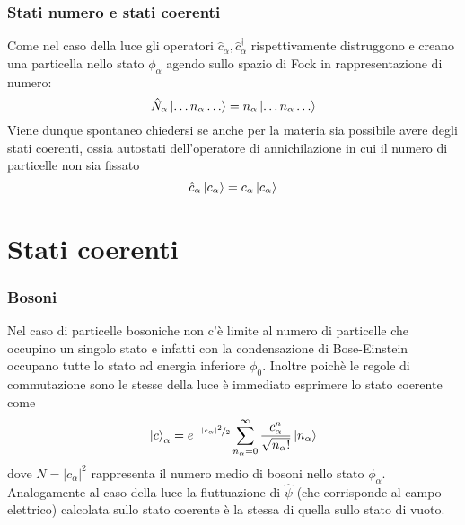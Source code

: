 \documentclass{beamer}
\begin{document}
\begin{frame}
  \frametitle{Stati numero e stati coerenti}
  Come nel caso della luce gli operatori $\hat{c}_{\alpha},\hat{c}_{\alpha}^\dagger$ rispettivamente distruggono e creano una particella nello stato $\phi_\alpha$ agendo sullo spazio di Fock in rappresentazione di numero:
  \begin{equation*}
    \hat{N}_\alpha \ket{\dots n_\alpha \dots} = n_\alpha \ket{\dots n_\alpha \dots}
  \end{equation*}
  Viene dunque spontaneo chiedersi se anche per la materia sia possibile avere degli stati coerenti, ossia autostati dell'operatore di annichilazione in cui il numero di particelle non sia fissato
  \begin{equation*}
    \hat{c}_\alpha \ket{c_\alpha} = c_\alpha \ket{c_\alpha}
  \end{equation*}
\end{frame}

\section{Stati coerenti}
\begin{frame}
  \frametitle{Bosoni}
  Nel caso di particelle bosoniche non c'è limite al numero di particelle che occupino un singolo stato e infatti con la condensazione di Bose-Einstein occupano tutte lo stato ad energia inferiore $\phi_0$. Inoltre poichè le regole di commutazione sono le stesse della luce è immediato esprimere lo stato coerente come
  \begin{equation*}
    \ket{c}_\alpha = e^{-\frac[f]{|c_\alpha|^2}{2}} \sum_{n_\alpha = 0}^\infty \frac{c_\alpha^n}{\sqrt{n_\alpha!}} \ket{n_\alpha}
  \end{equation*}
  dove $\overbar{N} = |c_\alpha|^2$ rappresenta il numero medio di bosoni nello stato $\phi_\alpha$.\\
  Analogamente al caso della luce la fluttuazione di $\hat{\psi}$ (che corrisponde al campo elettrico) calcolata sullo stato coerente è la stessa di quella sullo stato di vuoto.
\end{frame}
\end{document}
